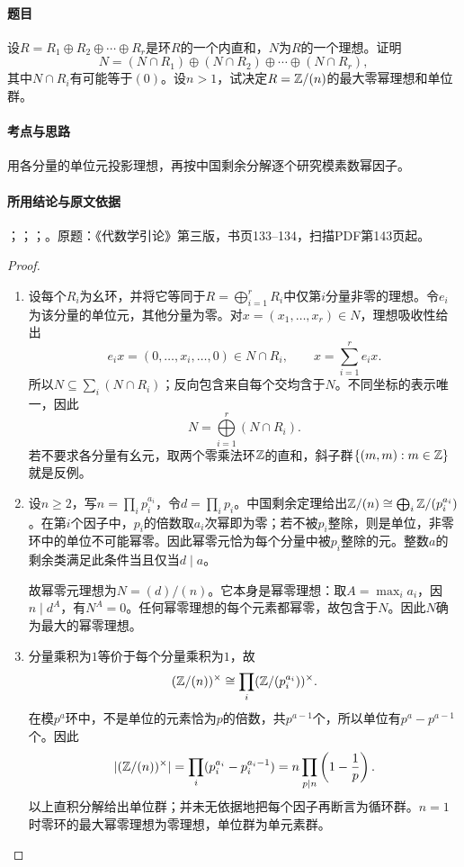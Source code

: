 \label{ex:3:32}

\paragraph{题目}

设$R=R_1\oplus R_2\oplus\cdots\oplus R_r$是环$R$的一个内直和，$N$为$R$的一个理想。证明
\[
N=(N\cap R_1)\oplus(N\cap R_2)\oplus\cdots\oplus(N\cap R_r),
\]
其中$N\cap R_i$有可能等于$(0)$。设$n>1$，试决定$R=\mathbb Z/(n)$的最大零幂理想和单位群。

\paragraph{考点与思路}

用各分量的单位元投影理想，再按中国剩余分解逐个研究模素数幂因子。

\paragraph{所用结论与原文依据}

；；；。原题：《代数学引论》第三版，书页133--134，扫描PDF第143页起。


\begin{proof}

\begin{enumerate}
\item 设每个$R_i$为幺环，并将它等同于$R=\bigoplus\limits_{i=1}^rR_i$中仅第$i$分量非零的理想。令$e_i$为该分量的单位元，其他分量为零。对$x=(x_1,\ldots,x_r)\in N$，理想吸收性给出
\[
e_ix=(0,\ldots,x_i,\ldots,0)\in N\cap R_i,\qquad
x=\sum_{i=1}^r e_ix.
\]
所以$N\subseteq\sum_i(N\cap R_i)$；反向包含来自每个交均含于$N$。不同坐标的表示唯一，因此
\[
N=\bigoplus\limits_{i=1}^r(N\cap R_i).
\]
若不要求各分量有幺元，取两个零乘法环$\mathbb Z$的直和，斜子群$\{(m,m):m\in\mathbb Z\}$就是反例。
\item 设$n\ge2$，写$n=\prod_i p_i^{a_i}$，令$d=\prod_i p_i$。中国剩余定理给出$\mathbb Z/(n)\cong\bigoplus_i\mathbb Z/(p_i^{a_i})$。在第$i$个因子中，$p_i$的倍数取$a_i$次幂即为零；若不被$p_i$整除，则是单位，非零环中的单位不可能幂零。因此幂零元恰为每个分量中被$p_i$整除的元。整数$a$的剩余类满足此条件当且仅当$d\mid a$。

故幂零元理想为$N=(d)/(n)$。它本身是幂零理想：取$A=\max_i a_i$，因$n\mid d^A$，有$N^A=0$。任何幂零理想的每个元素都幂零，故包含于$N$。因此$N$确为最大的幂零理想。
\item 分量乘积为$1$等价于每个分量乘积为$1$，故
\[
(\mathbb Z/(n))^\times\cong\prod_i(\mathbb Z/(p_i^{a_i}))^\times.
\]
在模$p^a$环中，不是单位的元素恰为$p$的倍数，共$p^{a-1}$个，所以单位有$p^a-p^{a-1}$个。因此
\[
|(\mathbb Z/(n))^\times|=\prod_i(p_i^{a_i}-p_i^{a_i-1})
=n\prod_{p\mid n}\left(1-\frac1p\right).
\]
以上直积分解给出单位群；并未无依据地把每个因子再断言为循环群。$n=1$时零环的最大幂零理想为零理想，单位群为单元素群。
\end{enumerate}

\end{proof}

